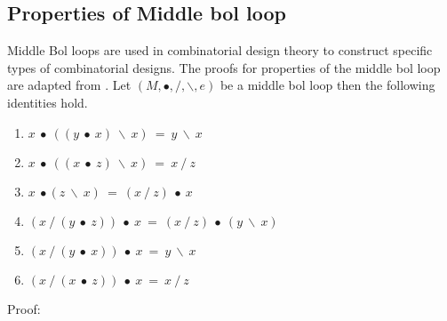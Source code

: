 \subsection{Properties of Middle bol loop}
Middle Bol loops are used in combinatorial design theory to construct specific
types of combinatorial designs. The proofs for properties of the middle bol loop are
adapted from \cite{jaiyeola2021new}. Let $(M, ∙, /, \backslash, e)$ be a middle bol loop then the
following identities hold.
\begin{enumerate}
\item \(x\ ∙\ ((y\ ∙\ x)\ \backslash \ x)\ =\ y\ \backslash\ x\) 
\item \(x\ ∙\ ((x\ ∙\ z)\ \backslash \ x)\ =\ x\ /\ z\)
\item \(x\ ∙ (z\ \backslash\ x)\ =\ (x\ /\ z)\ ∙\ x\)
\item \((x\ /\ (y\ ∙\ z))\ ∙\ x\ =\ (x\ /\ z)\ ∙\ (y\ \backslash\ x)\)
\item \((x\ /\ (y\ ∙\ x))\ ∙\ x\ =\ y\ \backslash \ x\)
\item \((x\ /\ (x\ ∙\ z))\ ∙\ x\ = \ x\ /\  z\)
\end{enumerate}
Proof:
